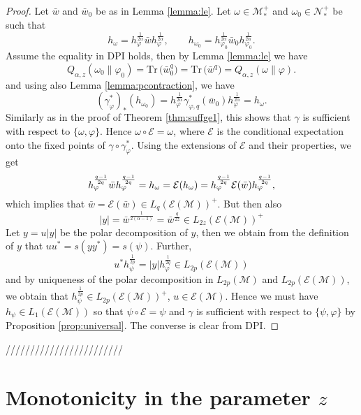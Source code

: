 \documentclass[12pt]{article}
\theoremstyle{definition}
\theoremstyle{remark}
\numberwithin{equation}{section}
\def\cE{\mathcal E}
\def\Me{\mathcal M}
\def\Ne{\mathcal N}
\def \Tr{\mathrm{Tr}\,}
\def\ffi{\varphi}
\begin{document}
\begin{proof} Let $\bar w$ and $\bar w_0$ be as in Lemma \ref{lemma:le}. Let $\omega\in
\Me_*^+$ and $\omega_0\in \Ne_*^+$ be such that
\[
h_\omega=h_\ffi^{\frac1{2\alpha}}\bar wh_\ffi^{\frac1{2\alpha}},\qquad
h_{\omega_0}=h_{\ffi_0}^{\frac1{2\alpha}}\bar w_0h_{\ffi_0}^{\frac1{2\alpha}}.
\]
 Assume the equality in DPI holds, then by Lemma
\ref{lemma:le} we have
\[
Q_{\alpha,z}(\omega_0\|\varphi_0)=\Tr \bigl(\bar w_0^q\bigr)=\Tr \bigl(\bar
w^q\bigr)=Q_{\alpha,z}(\omega\|\varphi).
\]
and using also Lemma \ref{lemma:pcontraction}, we have
\[
(\gamma^*_\ffi)_*(h_{\omega_0})=h_\ffi^{\frac1{2\alpha}}\gamma^*_{\ffi,q}(\bar
w_0)h_\ffi^{\frac1{2\alpha}}=h_\omega.
\]
Similarly as in the proof of Theorem \ref{thm:suffge1}, this shows that $\gamma$ is sufficient with
respect to $\{\omega,\ffi\}$. Hence $\omega\circ \cE=\omega$, where $\cE$ is the
conditional expectation onto the fixed points of $\gamma\circ\gamma^*_\ffi$.  Using the
extensions of $\cE$ and their
properties, we get
\[
h_\varphi^{q-1\over2q}\bar
wh_\varphi^{q-1\over 2q}=h_\omega=\cE(h_\omega)=h_\varphi^{q-1\over 2q}\cE(\bar
w)h_\varphi^{q-1\over 2q},
\]
which implies that $\bar w=\cE(\bar w)\in L_q(\cE(\Me))^+$. But then also 
\[
|y|=\bar w^{\frac1{2(\alpha-1)}}=\bar w^{\frac{q}{2z}}\in L_{2z}(\cE(\Me))^+
\]
Let $y=u|y|$ be the polar decomposition of $y$, then we obtain from the definition of $y$ that
$uu^*=s(yy^*)=s(\psi)$. Further,
\[
u^*h_\psi^{\frac1{2p}}=|y|h_\varphi^{\frac1{2q}}\in L_{2p}(\cE(\Me))
\]
and by uniqueness of the polar decomposition in $L_{2p}(\Me)$ and $L_{2p}(\cE(\Me))$, we
obtain that $h_{\psi}^{\frac1{2p}}\in L_{2p}(\cE(\Me))^+$, $u\in \cE(\Me)$. Hence we must
have $h_\psi\in L_1(\cE(\Me))$ so that $\psi\circ\cE=\psi$ and $\gamma$ is sufficient with
respect to $\{\psi,\ffi\}$ by Proposition \ref{prop:universal}. The converse is clear from
DPI.


\end{proof}



////////////////////////

\section{Monotonicity in the parameter $z$}
\end{document}
